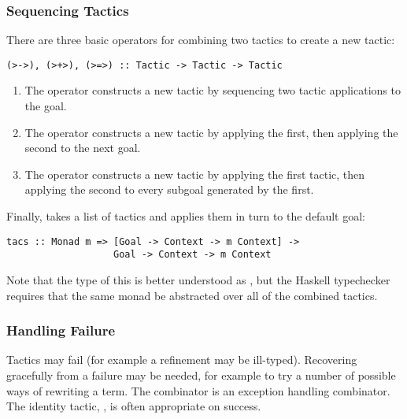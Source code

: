 \subsubsection{Sequencing Tactics}
There are three basic operators for combining two tactics to create a 
new tactic:

\begin{verbatim}
(>->), (>+>), (>=>) :: Tactic -> Tactic -> Tactic
\end{verbatim}

\begin{enumerate}
\item The \hdecl{>->} operator constructs a new tactic by sequencing two
tactic applications to the  goal.

\item The \hdecl{>+>} operator constructs a new tactic by applying the
  first, then applying the second to the next  goal.

\item The \hdecl{>=>} operator constructs a new tactic by applying the first
tactic, then applying the second to every subgoal generated by the first.

\end{enumerate}

\noindent
Finally,  takes a list of tactics and applies
them in turn to the default goal:

\begin{verbatim}
tacs :: Monad m => [Goal -> Context -> m Context] ->
                   Goal -> Context -> m Context
\end{verbatim}

Note that the type of this is better understood as , but the Haskell typechecker requires that the same monad be
abstracted over all of the combined tactics.

\subsubsection{Handling Failure}
Tactics may fail (for example a refinement may be ill-typed). 
Recovering gracefully from a failure may be needed, for
example to try a number of possible ways of rewriting a term.
The  combinator is an exception handling combinator.
The identity tactic, , is often appropriate on success.


